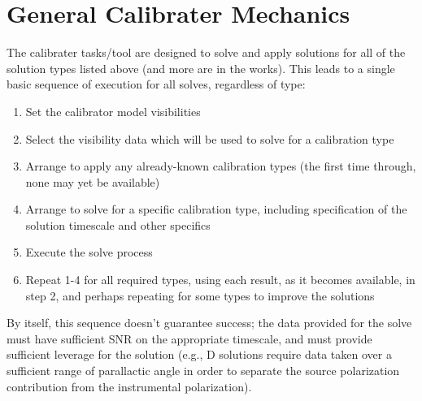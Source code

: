 \section{General Calibrater Mechanics}
\label{section:me.mech}

The calibrater tasks/tool are designed to solve and apply solutions
for all of the solution types listed above (and more are in the
works). This leads to a single basic sequence of execution for all
solves, regardless of type: 

\begin{enumerate}
   \item Set the calibrator model visibilities
   \item Select the visibility data which will be used to solve for a
      calibration type 
   \item Arrange to apply any already-known calibration types (the first
      time through, none may yet be available) 
   \item Arrange to solve for a specific calibration type, including
      specification of the solution timescale and other specifics 
   \item Execute the solve process
   \item Repeat 1-4 for all required types, using each result, as it
      becomes available, in step 2, and perhaps repeating for some types
      to improve the solutions  
\end{enumerate}

By itself, this sequence doesn't guarantee success; the data provided
for the solve must have sufficient SNR on the appropriate timescale,
and must provide sufficient leverage for the solution (e.g., D
solutions require data taken over a sufficient range of parallactic
angle in order to separate the source polarization contribution from
the instrumental polarization). 

